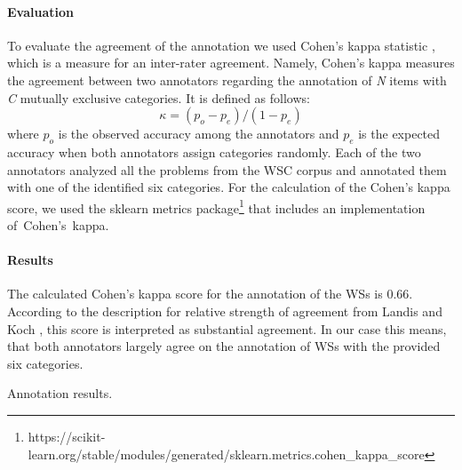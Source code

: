 \paragraph{Evaluation}
To evaluate the agreement of the annotation 
we used Cohen's kappa statistic \cite{doi:10.1177/001316446002000104}, which is a measure for an inter-rater agreement. Namely, Cohen's kappa measures the agreement between two annotators regarding the annotation of \textit{N} items with \textit{C} mutually exclusive categories. 
It is defined as follows: 
\begin{equation}
	\kappa = (p_o-p_e)/(1-p_e)
\end{equation}
where $p_o$ is the observed accuracy among the annotators and $p_e$ is the expected accuracy when both annotators assign categories randomly. Each of the two annotators analyzed all the problems from the WSC corpus and annotated them with one of the identified six categories. For the calculation of the Cohen's kappa score, we used the sklearn metrics  package\footnote{https://scikit-learn.org/stable/modules/generated/sklearn.metrics.cohen\_kappa\_score} that includes an implementation of~Cohen's~kappa.

\paragraph{Results}
The calculated Cohen's kappa score for the annotation of the WSs is 0.66. According to the description for relative strength of agreement from Landis and Koch \cite{articleM}, this score is interpreted as substantial agreement. In our case this means, that both annotators largely agree on the annotation of WSs with the provided six categories.

\begin{table}[h!]
	\centering
	
	\caption{{\label{kappa}}Annotation results.}
\end{table}


